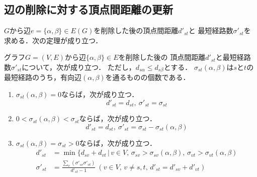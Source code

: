 \subsection*{辺の削除に対する頂点間距離の更新}
$G$から辺$e=\{\alpha,\beta\}\in E(G)$を削除した後の頂点間距離$d'_{st}$と
最短経路数$\sigma'_{st}$を求める．次の定理が成り立つ．
\begin{theorem}
  \label{thm:update-distance-on-delete}
  グラフ$G=(V,E)$から辺$\{\alpha,\beta\}\in E$を削除した後の
  頂点間距離$d'_{st}$と最短経路数$\sigma'_{st}$について，次が成り立つ．
  ただし，$d_{s\alpha}\leq d_{s\beta}$とする．
  $\sigma_{st}(\alpha,\beta)$は$s$と$t$の最短経路のうち，有向辺$(\alpha,\beta)$を通るものの個数である．
  \begin{enumerate}
  \item $\sigma_{st}(\alpha,\beta)=0$ならば，次が成り立つ．
    \[ d'_{st}=d_{st},\:\sigma'_{st}=\sigma_{st} \]
  \item $0<\sigma_{st}(\alpha,\beta)<\sigma_{st}$ならば，次が成り立つ．
    \[ d'_{st}=d_{st},\:\sigma'_{st}=\sigma_{st}-\sigma_{st}(\alpha,\beta) \]
  \item $\sigma_{st}(\alpha,\beta)=\sigma_{st}>0$ならば，次が成り立つ．
    \begin{equation*}
      \begin{aligned}
        d'_{st}&=\min\{d_{sv}+d_{vt}\,|\,v\in V,\,
        \sigma_{sv}>\sigma_{sv}(\alpha,\beta),\,
        \sigma_{vt}>\sigma_{vt}(\alpha,\beta) \\
        \sigma'_{st}&=\frac{\sum_v(\sigma'_{sv}\sigma'_{vt})}{d'_{st}-1}\:
        (v\in V,\,v\neq s,t,\,d'_{st}=d'_{sv}+d'_{vt})
      \end{aligned}
    \end{equation*}
  \end{enumerate}
\end{theorem}
